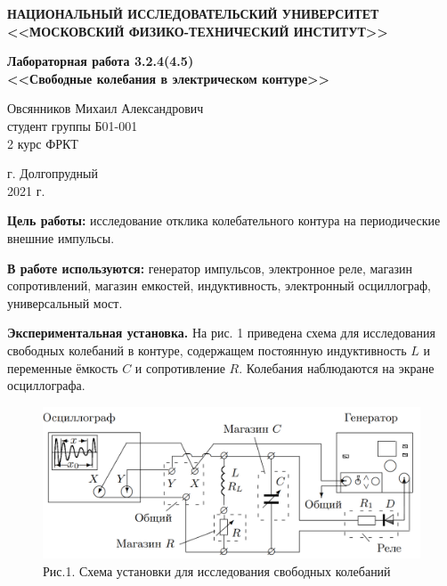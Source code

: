 \documentclass[a4paper,12pt]{article} %
\begin{document}
	\begin{center}
		
		\textbf{НАЦИОНАЛЬНЫЙ ИССЛЕДОВАТЕЛЬСКИЙ УНИВЕРСИТЕТ \\ <<МОСКОВСКИЙ ФИЗИКО-ТЕХНИЧЕСКИЙ ИНСТИТУТ>>}
		\vspace{13ex}
		
		\textbf{Лабораторная работа 3.2.4(4.5) \\ <<Свободные колебания в электрическом контуре>> }
		\vspace{60ex}
		
		\normalsize{Овсянников Михаил Александрович \\ студент группы Б01-001\\ 2 курс ФРКТ\\}
	\end{center}
	
	\vfill 
	
	\begin{center}
		г. Долгопрудный\\ 
		2021 г.
	\end{center}
	
	\thispagestyle{empty} %
	
	\newpage
	
\textbf{Цель работы:} исследование отклика колебательного контура на периодические внешние импульсы.

\textbf{В работе используются:} генератор импульсов, электронное реле, магазин сопротивлений, магазин емкостей, индуктивность, электронный осциллограф, универсальный мост.

\textbf{Экспериментальная установка.} На рис. 1 приведена схема для исследования свободных колебаний в контуре, содержащем постоянную индуктивность $L$ и переменные ёмкость $C$ и сопротивление $R$. Колебания наблюдаются на экране осциллографа.

\begin{figure}[h!]
	\centering
	\includegraphics[scale=0.52]{Pictures/Установка.png}
	\caption*{Рис.1. Схема установки для исследования свободных колебаний}
\end{figure}
\end{document}
